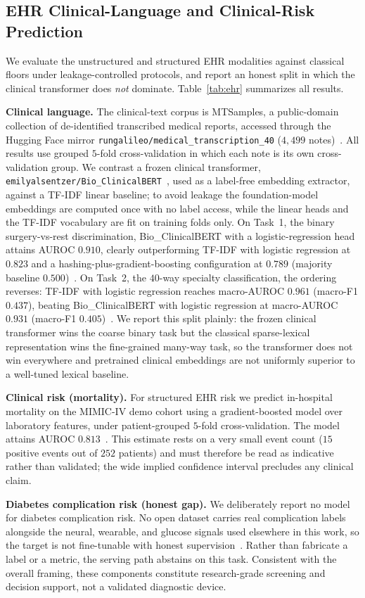 \subsection{EHR Clinical-Language and Clinical-Risk Prediction}
\label{sec:ehr}

We evaluate the unstructured and structured EHR modalities against classical floors under leakage-controlled protocols, and report an honest split in which the clinical transformer does \emph{not} dominate. Table~\ref{tab:ehr} summarizes all results.

\textbf{Clinical language.} The clinical-text corpus is MTSamples, a public-domain collection of de-identified transcribed medical reports, accessed through the Hugging Face mirror \texttt{rungalileo/medical\_transcription\_40} ($4{,}499$ notes)~. All results use grouped $5$-fold cross-validation in which each note is its own cross-validation group. We contrast a frozen clinical transformer, \texttt{emilyalsentzer/Bio\_ClinicalBERT}~\cite{clinicalbert}, used as a label-free embedding extractor, against a TF-IDF linear baseline; to avoid leakage the foundation-model embeddings are computed once with no label access, while the linear heads and the TF-IDF vocabulary are fit on training folds only. On Task~1, the binary surgery-vs-rest discrimination, Bio\_ClinicalBERT with a logistic-regression head attains AUROC $0.910$, clearly outperforming TF-IDF with logistic regression at $0.823$ and a hashing-plus-gradient-boosting configuration at $0.789$ (majority baseline $0.500$)~. On Task~2, the $40$-way specialty classification, the ordering reverses: TF-IDF with logistic regression reaches macro-AUROC $0.961$ (macro-F1 $0.437$), beating Bio\_ClinicalBERT with logistic regression at macro-AUROC $0.931$ (macro-F1 $0.405$)~. We report this split plainly: the frozen clinical transformer wins the coarse binary task but the classical sparse-lexical representation wins the fine-grained many-way task, so the transformer does not win everywhere and pretrained clinical embeddings are not uniformly superior to a well-tuned lexical baseline.

\textbf{Clinical risk (mortality).} For structured EHR risk we predict in-hospital mortality on the MIMIC-IV demo cohort using a gradient-boosted model over laboratory features, under patient-grouped $5$-fold cross-validation. The model attains AUROC $0.813$~. This estimate rests on a very small event count ($15$ positive events out of $252$ patients) and must therefore be read as indicative rather than validated; the wide implied confidence interval precludes any clinical claim.

\textbf{Diabetes complication risk (honest gap).} We deliberately report no model for diabetes complication risk. No open dataset carries real complication labels alongside the neural, wearable, and glucose signals used elsewhere in this work, so the target is not fine-tunable with honest supervision~. Rather than fabricate a label or a metric, the serving path abstains on this task. Consistent with the overall framing, these components constitute research-grade screening and decision support, not a validated diagnostic device.